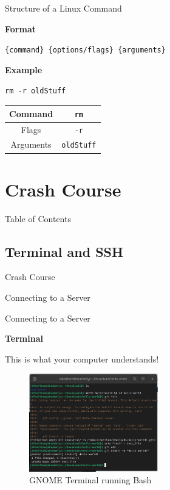 \documentclass{beamer}
\begin{document}
\begin{frame}{Structure of a Linux Command}
	\begin{Large}
		\textbf{Format} \\
	\end{Large}
	\texttt{\{command\} \{options/flags\} \{arguments\}}

	\vspace{0.3cm}

	\begin{Large}
		\textbf{Example} \\
	\end{Large}
	\texttt{rm -r oldStuff}

	\vspace{0.3cm}

	\begin{tabular}{|c|c|}
		\hline
		Command & \texttt{rm} \\
		\hline
		Flags & \texttt{-r} \\
		\hline
		Arguments & \texttt{oldStuff} \\
		\hline
	\end{tabular}
\end{frame}

\section{Crash Course}
\begin{frame}{Table of Contents}
	\tableofcontents[currentsection]
\end{frame}

\subsection{Terminal and SSH}
\begin{frame}{Crash Course}
	\begin{center}
		\Huge Connecting to a Server
	\end{center}
\end{frame}

\begin{frame}{Connecting to a Server}
	\begin{Large}
		\textbf{Terminal} \\
	\end{Large}
	This is what your computer understands!
	\begin{figure}
		\centering
		\includegraphics[width=0.5\textwidth]{terminal.png}
		\caption{GNOME Terminal running Bash}
	\end{figure}
\end{frame}
\end{document}
